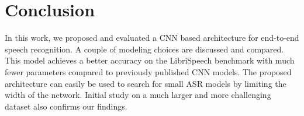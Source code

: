 \documentclass[a4paper]{article}
\begin{document}
 
\vspace{-0.2in}
\section{Conclusion}
\vspace{-0.05in}


In this work, we proposed and evaluated a CNN based architecture for end-to-end speech recognition. A couple of modeling choices are discussed and compared. This model achieves a better accuracy on the LibriSpeech benchmark with much fewer parameters compared to previously published CNN models. The proposed architecture can easily be used to search for small ASR models by limiting the width of the network. Initial study on a much larger and more challenging dataset also confirms our findings.





\end{document}
